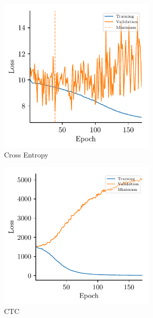\begin{figure}[h]
  \begin{subfigure}{3in}
  \centering
    \includegraphics[width=3in]{figures/results/losses/gru-inceptionv3}
    \caption{Cross Entropy}
  \end{subfigure}
  \hfill
  \begin{subfigure}{3in}
  \centering
    \includegraphics[width=3in]{figures/results/losses/ctc-inceptionv3}
    \caption{CTC}
  \end{subfigure}
  \caption{}
  \label{fig:loss-inceptionv3}
\end{figure}

